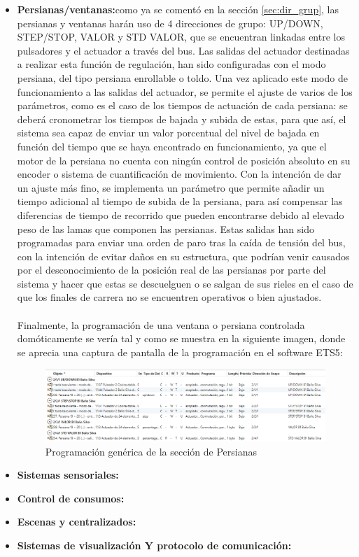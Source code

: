 \begin{itemize}
\item  \textbf{Persianas/ventanas:}como ya se comentó en la sección \ref{sec:dir_grup}, las persianas y ventanas harán uso de 4 direcciones de grupo: UP/DOWN, STEP/STOP, VALOR y STD VALOR, que se encuentran linkadas entre los pulsadores y el actuador a través del bus. Las salidas del actuador destinadas a realizar esta función de regulación, han sido configuradas con el modo persiana, del tipo persiana enrollable o toldo. Una vez aplicado este modo de funcionamiento a las salidas del actuador, se permite el ajuste de varios de los parámetros, como es el caso de los tiempos de actuación de cada persiana: se deberá cronometrar los tiempos de bajada y subida de estas, para que así, el sistema sea capaz de enviar un valor porcentual del nivel de bajada en función del tiempo que se haya encontrado en funcionamiento, ya que el motor de la persiana no cuenta con ningún control de posición absoluto en su encoder o sistema de cuantificación de movimiento. Con la intención de dar un ajuste más fino, se implementa un parámetro que permite añadir un tiempo adicional al tiempo de subida de la persiana, para así compensar las diferencias de tiempo de recorrido que pueden encontrarse debido al elevado peso de las lamas que componen las persianas. Estas salidas han sido programadas para enviar una orden de paro tras la caída de tensión del bus, con la intención de evitar daños en su estructura, que podrían venir causados por el desconocimiento de la posición real de las persianas por parte del sistema y hacer que estas se descuelguen o se salgan de sus rieles en el caso de que los finales de carrera no se encuentren operativos o bien ajustados.\\\\
Finalmente, la programación de una ventana o persiana controlada domóticamente se vería tal y como se muestra en la siguiente imagen, donde se aprecia una captura de pantalla de la programación en el software ETS5:
 \begin{center}
\begin{figure}[H]
\includegraphics[width=1.15\textwidth]{figures/prog_pers.png}   
\caption{Programación genérica de la sección de Persianas}
\label{fig:prog_pers}
\end{figure}
\end{center}

\item  \textbf{Sistemas sensoriales:}
\item  \textbf{Control de consumos:}
\item  \textbf{Escenas y centralizados:}
\item  \textbf{Sistemas de visualización Y protocolo de comunicación:}
\end{itemize}